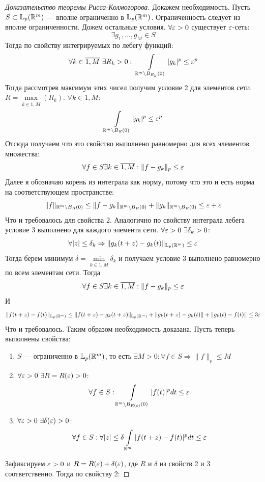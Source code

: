 \begin{proof}[Доказательство теоремы Рисса-Колмогорова]
	Докажем необходимость. Пусть $S \subset \mathbb{L}_p(\mathbb{R}^m)$ --- вполне ограниченно в $\mathbb{L}_p(\mathbb{R}^m)$. Ограниченность следует из вполне ограниченности.  Дожем остальные условия. $\forall \varepsilon > 0$ существует $\varepsilon$-сеть:
	$$
	\exists g_1, \dots, g_M \in S
	$$
	Тогда по свойству интегрируемых по лебегу функций:
	$$
	\forall k \in \overline{1, M} \ \exists R_k > 0: \ \int\limits_{\mathbb{R}^m \setminus B_{R_k}(0)} |g_k|^p \leq \varepsilon^p
	$$
	Тогда рассмотрев максимум этих чисел получим условие 2 для элементов сети. $R = \max\limits_{k \in \overline{1, M}}(R_k)$. $\forall k \in \overline{1, M}$:
	$$
	\int\limits_{\mathbb{R}^m \setminus B_{R}(0)} |g_k|^p \leq \varepsilon^p
	$$
	Отсюда получаем что это свойство выполнено равномерно для всех элементов множества:
	$$
	\forall f \in S \exists k \in \overline{1, M}: \|f - g_k\|_p \leq \varepsilon
	$$
	Далее я обозначаю корень из интеграла как норму, потому что это и есть норма на соответствующем пространстве:
	$$
	\|f\|_{\mathbb{R}^m \setminus B_{R}(0)} \leq \|f - g_k\|_{\mathbb{R}^m \setminus B_{R}(0)}  + \|g_k\|_{\mathbb{R}^m \setminus B_{R}(0)}  \leq \varepsilon + \varepsilon
	$$
	Что и требовалось для свойства 2. Аналогично по свойству интеграла лебега условие 3 выполнено для каждого элемента сети. $\forall \varepsilon > 0 \ \exists \delta_k > 0$:
	$$
	\forall |z| \leq \delta_k \Rightarrow \|g_k(t+z) - g_k(t)\|_{\mathbb{L}_p(\mathbb{R}^m)} \leq \varepsilon
	$$
	Тогда берем минимум $\delta = \min\limits_{k \in \overline{1, M}} \delta_k$ и получаем условие 3 выполнено равномерно по всем элементам сети. Тогда 
	$$
	\forall f \in S \exists k \in \overline{1, M}: \|f - g_k\|_p \leq \varepsilon
	$$
	И
	$$
	\|f(t+z) - f(t)\|_{\mathbb{L}_p(\mathbb{R}^m)}\leq \|f(t+z) - g_k(t+z)\|_{\mathbb{L}_p(\mathbb{R}^m)} + \|g_k(t+z) - g_k(t)\| + \|g_k(t) - f(t)\| \leq 3\varepsilon
	$$
	Что и требовалось. Таким образом необходимость доказана. Пусть теперь выполнены свойства:
	\begin{enumerate}
		\item $S$ --- ограниченно в $\mathbb{L}_p(\mathbb{R}^m)$, то есть $\exists M > 0: \forall f \in S \Rightarrow \|f\|_p \leq M$
		\item $\forall \varepsilon > 0 \ \exists R = R(\varepsilon) > 0$: 
		$$
		\forall f \in S: \int\limits_{\mathbb{R}^m \setminus B_{R(\varepsilon)}(0)} |f(t)|^pdt \leq \varepsilon
		$$
		\item $\forall \varepsilon > 0 \ \exists \delta(\varepsilon) > 0$:
		$$
		\forall f \in S : \forall |z| \leq \delta \int\limits_{\mathbb{R}^m} |f(t + z) - f(t)|^p dt  \leq \varepsilon
		$$
	\end{enumerate}
	Зафиксируем $\varepsilon >0$ и $R = R(\varepsilon) +\delta(\varepsilon)$, где $R$ и $\delta$ из свойств 2 и 3 соответственно. Тогда по свойству 2: 

\end{proof}
